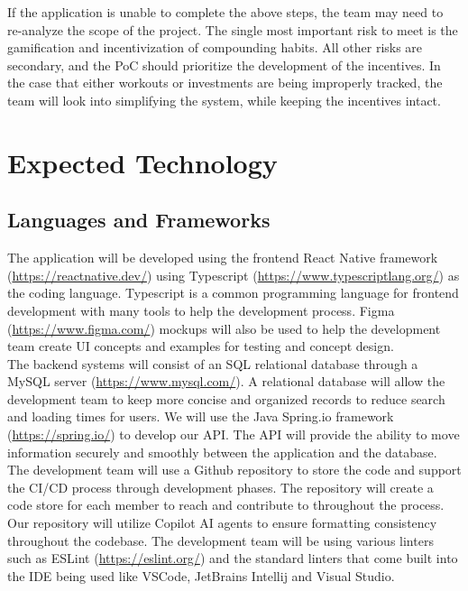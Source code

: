\documentclass{article}
\begin{document}
\bigbreak
\noindent If the application is unable to complete the above steps, the team may need to re-analyze the scope of the project.
The single most important risk to meet is the gamification and incentivization of compounding habits.
All other risks are secondary, and the PoC should prioritize the development of the incentives.
In the case that either workouts or investments are being improperly tracked, the team will look into simplifying the system, while keeping the incentives intact.

\section{Expected Technology}

\subsection{Languages and Frameworks}
The application will be developed using the frontend React Native framework (\url{https://reactnative.dev/}) using Typescript (\url{https://www.typescriptlang.org/}) as the coding language. 
Typescript is a common programming language for frontend development with many tools to help the development process. 
Figma (\url{https://www.figma.com/}) mockups will also be used to help the development team create UI concepts and examples for testing and concept design.
\\The backend systems will consist of an SQL relational database through a MySQL server (\url{https://www.mysql.com/}). 
A relational database will allow the development team to keep more concise and organized records to reduce search and loading times for users. 
We will use the Java Spring.io framework (\url{https://spring.io/}) to develop our API. The API will provide the ability to move information securely and smoothly between the application and the database. 
\\The development team will use a Github repository to store the code and support the CI/CD process through development phases. The repository will create a code store for each member to reach and contribute to throughout the process.
Our repository will utilize Copilot AI agents to ensure formatting consistency throughout the codebase. 
The development team will be using various linters such as ESLint (\url{https://eslint.org/}) and the standard linters that come built into the IDE being used like VSCode, JetBrains Intellij and Visual Studio. 
\end{document}
